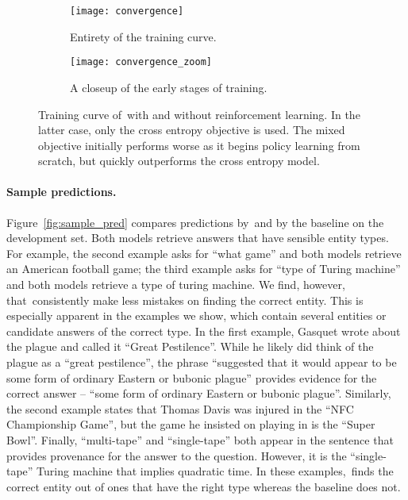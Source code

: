 \documentclass{article} %
\begin{document}
\begin{figure}
\centering
\begin{subfigure}{.5\textwidth}
  \centering
  \texttt{[image: convergence]}
  \caption{Entirety of the training curve.}
  \label{fig:rl_curve_whole}
\end{subfigure}%
\begin{subfigure}{.5\textwidth}
  \centering
  \texttt{[image: convergence\_zoom]}
  \caption{A closeup of the early stages of training.}
  \label{fig:rl_curve_zoom}
\end{subfigure}
\caption{
Training curve of~\modelname with and without reinforcement learning.
In the latter case, only the cross entropy objective is used.
The mixed objective initially performs worse as it begins policy learning from scratch, but quickly outperforms the cross entropy model.
}
\label{fig:rl_curve}
\end{figure}



\paragraph{Sample predictions.}
Figure~\ref{fig:sample_pred} compares predictions by~\modelname and by the baseline on the development set.
Both models retrieve answers that have sensible entity types.
For example, the second example asks for ``what game'' and both models retrieve an American football game;
the third example asks for ``type of Turing machine'' and both models retrieve a type of turing machine.
We find, however, that~\modelname consistently make less mistakes on finding the correct entity.
This is especially apparent in the examples we show, which contain several entities or candidate answers of the correct type.
In the first example, Gasquet wrote about the plague and called it ``Great Pestilence''.
While he likely did think of the plague as a ``great pestilence'', the phrase ``suggested that it would appear to be some form of ordinary Eastern or bubonic plague'' provides evidence for the correct answer -- ``some form of ordinary Eastern or bubonic plague''.
Similarly, the second example states that Thomas Davis was injured in the ``NFC Championship Game'', but the game he insisted on playing in is the ``Super Bowl''.
Finally, ``multi-tape'' and ``single-tape'' both appear in the sentence that provides provenance for the answer to the question.
However, it is the ``single-tape'' Turing machine that implies quadratic time.
In these examples,~\modelname finds the correct entity out of ones that have the right type whereas the baseline does not.
\end{document}
